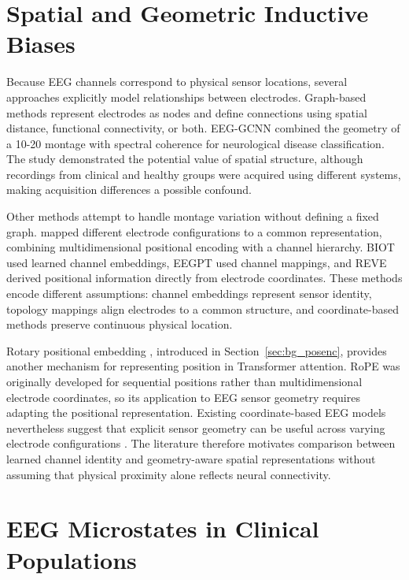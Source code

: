 \section{Spatial and Geometric Inductive Biases}\label{sec:rel_spatial}

Because EEG channels correspond to physical sensor locations, several approaches explicitly model relationships between electrodes. Graph-based methods represent electrodes as nodes and define connections using spatial distance, functional connectivity, or both. EEG-GCNN \parencite{waghEEGGCNNAugmentingElectroencephalogram2020} combined the geometry of a 10-20 montage with spectral coherence for neurological disease classification. The study demonstrated the potential value of spatial structure, although recordings from clinical and healthy groups were acquired using different systems, making acquisition differences a possible confound.

Other methods attempt to handle montage variation without defining a fixed graph. \textcite{yiLearningTopologyAgnosticEEG2023} mapped different electrode configurations to a common representation, combining multidimensional positional encoding with a channel hierarchy. BIOT \parencite{yangBIOTBiosignalTransformer2023} used learned channel embeddings, EEGPT \parencite{wangEEGPTPretrainedTransformer2024} used channel mappings, and REVE \parencite{el2026reve} derived positional information directly from electrode coordinates. These methods encode different assumptions: channel embeddings represent sensor identity, topology mappings align electrodes to a common structure, and coordinate-based methods preserve continuous physical location.

Rotary positional embedding \parencite[RoPE;][]{suRoFormerEnhancedTransformer2024}, introduced in Section~\ref{sec:bg_posenc}, provides another mechanism for representing position in Transformer attention. RoPE was originally developed for sequential positions rather than multidimensional electrode coordinates, so its application to EEG sensor geometry requires adapting the positional representation. Existing coordinate-based EEG models nevertheless suggest that explicit sensor geometry can be useful across varying electrode configurations \parencite{el2026reve}. The literature therefore motivates comparison between learned channel identity and geometry-aware spatial representations without assuming that physical proximity alone reflects neural connectivity.


\section{EEG Microstates in Clinical Populations}\label{sec:rel_microstates}

